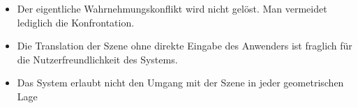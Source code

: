 \begin{itemize}
	\item Der eigentliche Wahrnehmungskonflikt wird nicht gelöst. Man vermeidet lediglich die Konfrontation.
	\item Die Translation der Szene ohne direkte Eingabe des Anwenders ist fraglich für die Nutzerfreundlichkeit des Systems.
	\item Das System erlaubt nicht den Umgang mit der Szene in jeder geometrischen Lage
\end{itemize}